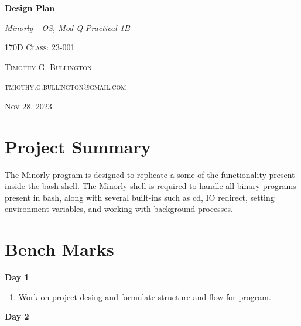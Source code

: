 \documentclass{article}
\begin{document}
\begin{titlepage}
    \begin{center}
        \vspace*{6cm}

        
        \textbf{\Huge{Design Plan}}
            
        \vspace{0.5cm}
        \textit{\large{Minorly - OS, Mod Q Practical 1B}}
        \vspace{0.5cm}
        
        \textsc{\large{170D Class: 23-001}}
            
        \vspace{7.5cm}
            
        \textsc{\small{Timothy G. Bullington}}
        \vspace{0.5cm}
        
        
        
        \textsc{\small{tmiothy.g.bullington@gmail.com}}

        \vspace{0.5cm}
        \textsc{\small{Nov 28, 2023}}

            

    \end{center}
\end{titlepage}

\section{Project Summary}

The Minorly program is designed to replicate a some of the functionality present inside the bash shell. The Minorly shell is required to handle all binary programs present in bash, along with several built-ins such as cd, IO redirect, setting environment variables, and working with background processes.\\

\section{Bench Marks}

\textbf{Day 1}

\begin{enumerate}
 \item Work on project desing and formulate structure and flow for program. 
\end{enumerate}

\noindent\textbf{Day 2}
\end{document}
